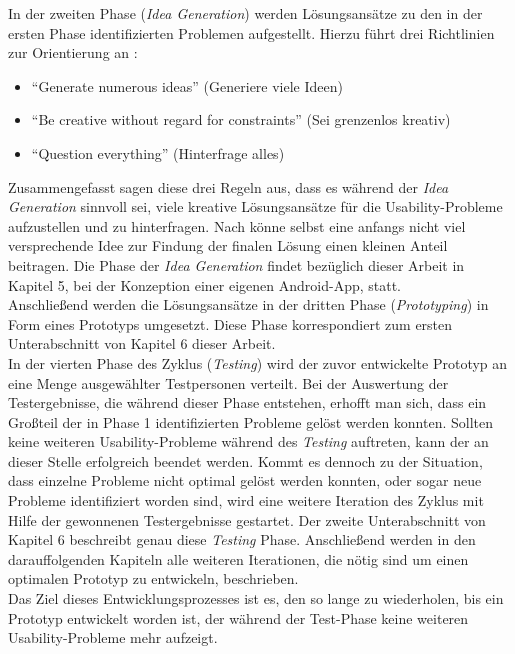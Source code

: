 In der zweiten Phase (\emph{Idea Generation}) werden Lösungsansätze zu den in der ersten Phase identifizierten Problemen aufgestellt.
Hierzu führt \citeauthor{Norman13} drei Richtlinien zur Orientierung an \citep[Seite 226]{Norman13}:

\begin{itemize}
  \item ``Generate numerous ideas'' (Generiere viele Ideen)
  \item ``Be creative without regard for constraints'' (Sei grenzenlos kreativ)
  \item ``Question everything'' (Hinterfrage alles)
\end{itemize}

\noindent
Zusammengefasst sagen diese drei Regeln aus, dass es während der \emph{Idea Generation} sinnvoll sei, viele kreative Lösungsansätze für die Usability-Probleme aufzustellen und zu hinterfragen.
Nach \citeauthor{Norman13} könne selbst eine anfangs nicht viel versprechende Idee zur Findung der finalen Lösung einen kleinen Anteil beitragen.
Die Phase der \emph{Idea Generation} findet bezüglich dieser Arbeit in Kapitel 5, bei der Konzeption einer eigenen Android-App, statt. \\

Anschließend werden die Lösungsansätze in der dritten Phase (\emph{Prototyping}) in Form eines Prototyps umgesetzt.
Diese Phase korrespondiert zum ersten Unterabschnitt von Kapitel 6 dieser Arbeit. \\

In der vierten Phase des Zyklus (\emph{Testing}) wird der zuvor entwickelte Prototyp an eine Menge ausgewählter Testpersonen verteilt.
Bei der Auswertung der Testergebnisse, die während dieser Phase entstehen, erhofft man sich, dass ein Großteil der in Phase 1 identifizierten Probleme gelöst werden konnten.
Sollten keine weiteren Usability-Probleme während des \emph{Testing} auftreten, kann der \hcdp{} an dieser Stelle erfolgreich beendet werden.
Kommt es dennoch zu der Situation, dass einzelne Probleme nicht optimal gelöst werden konnten, oder sogar neue Probleme identifiziert worden sind, wird eine weitere Iteration des Zyklus mit Hilfe der gewonnenen Testergebnisse gestartet.
Der zweite Unterabschnitt von Kapitel 6 beschreibt genau diese \emph{Testing} Phase.
Anschließend werden in den darauffolgenden Kapiteln alle weiteren Iterationen, die nötig sind um einen optimalen Prototyp zu entwickeln, beschrieben. \\

Das Ziel dieses Entwicklungsprozesses ist es, den \hcdp{} so lange zu wiederholen, bis ein Prototyp entwickelt worden ist, der während der Test-Phase keine weiteren Usability-Probleme mehr aufzeigt.
